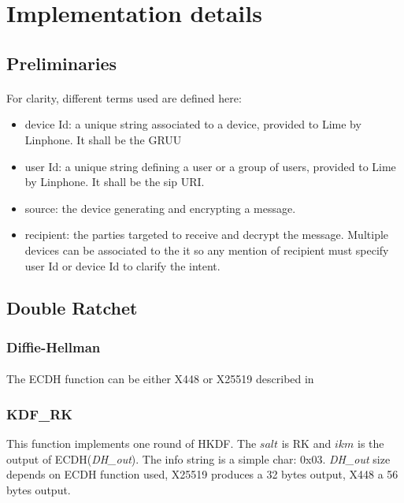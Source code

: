 \documentclass[a4paper,11pt]{article}
\begin{document}
\section{Implementation details}
  \subsection{Preliminaries}
    \paragraph{}For clarity, different terms used are defined here:
    \begin{itemize}
      \item device Id: a unique string associated to a device, provided to Lime by Linphone. It shall be the GRUU\cite{rfc5627}
      \item user Id: a unique string defining a user or a group of users, provided to Lime by Linphone. It shall be the sip URI.
      \item source: the device generating and encrypting a message.
      \item recipient: the parties targeted to receive and decrypt the message. Multiple devices can be associated to the it so any mention of recipient must specify user Id or device Id to clarify the intent.
    \end{itemize}

  \subsection{Double Ratchet}
    \subsubsection{Diffie-Hellman}
      \paragraph{}The ECDH function can be either X448 or X25519 described in \cite{rfc7748}
    \subsubsection{KDF\_RK}
      This function implements one round of HKDF\cite{rfc5869}. The $salt$ is RK and $ikm$ is the output of ECDH(\textit{DH\_out}). The info string is a simple char: 0x03. \textit{DH\_out} size depends on ECDH function used, X25519 produces a 32 bytes output, X448 a 56 bytes output. 
\end{document}

